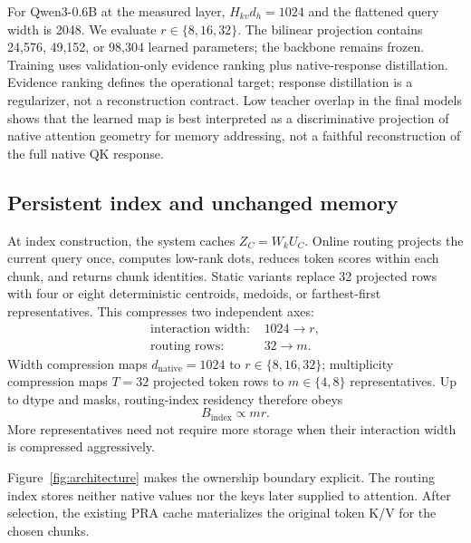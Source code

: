 \documentclass[11pt]{article}
\newcommand{\pra}{\textsc{PRA}\xspace}
\newcommand{\qk}{\textsc{QK}\xspace}
\newcommand{\kv}{\textsc{K/V}\xspace}
\begin{document}
For Qwen3-0.6B at the measured layer, $H_{kv}d_h=1024$ and the flattened query
width is 2048. We evaluate $r\in\{8,16,32\}$. The bilinear projection contains
24,576, 49,152, or 98,304 learned parameters; the backbone remains frozen.
Training uses validation-only evidence ranking plus native-response
distillation. Evidence ranking defines the operational target; response
distillation is a regularizer, not a reconstruction contract. Low teacher
overlap in the final models shows that the learned map is best interpreted as a
discriminative projection of native attention geometry for memory addressing,
not a faithful reconstruction of the full native \qk response.

\subsection{Persistent index and unchanged memory}
At index construction, the system caches $Z_C=W_kU_C$. Online routing projects
the current query once, computes low-rank dots, reduces token scores within each
chunk, and returns chunk identities. Static variants replace 32 projected rows
with four or eight deterministic centroids, medoids, or farthest-first
representatives. This compresses two independent axes:
\begin{align}
  \text{interaction width: }&1024\rightarrow r,\\
  \text{routing rows: }&32\rightarrow m.
\end{align}
Width compression maps $d_{\mathrm{native}}=1024$ to $r\in\{8,16,32\}$;
multiplicity compression maps $T=32$ projected token rows to $m\in\{4,8\}$
representatives. Up to dtype and masks, routing-index residency therefore obeys
\begin{equation}
  B_{\mathrm{index}}\propto mr.
  \label{eq:index-factorization}
\end{equation}
More representatives need not require more storage when their interaction
width is compressed aggressively.

Figure~\ref{fig:architecture} makes the ownership boundary explicit. The
routing index stores neither native values nor the keys later supplied to
attention. After selection, the existing \pra cache materializes the original
token \kv for the chosen chunks.
\end{document}
